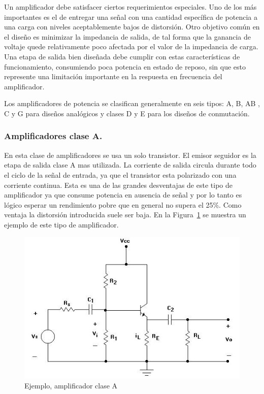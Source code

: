 Un amplificador debe satisfacer ciertos requerimientos especiales. Uno de los más importantes es el de entregar una señal con una cantidad específica de potencia a una carga con niveles aceptablemente bajos de distorsión. Otro objetivo común en el diseño es minimizar la impedancia de salida, de tal forma que la ganancia de voltaje quede relativamente poco afectada por el valor de la impedancia de carga. Una etapa de salida bien diseñada debe cumplir con estas características de funcionamiento, consumiendo poca potencia en estado de reposo, sin que esto represente una limitación importante en la respuesta en frecuencia del amplificador. 
 

Los amplificadores de potencia  se clasifican generalmente en seis tipos: A, B, AB , C y G para diseños analógicos y clases D y E para los diseños de conmutación. 
\medskip 
\subsubsection*{Amplificadores clase A.}


En esta clase de amplificadores se usa un solo transistor. El emisor seguidor es la etapa de salida clase A mas utilizada. La corriente de salida circula durante todo el ciclo de la señal de entrada, ya que el transistor esta polarizado con una corriente continua. Esta es una de las grandes desventajas de este tipo de amplificador ya que consume potencia en ausencia de señal y por lo tanto es lógico esperar un rendimiento pobre que en general no supera el 25\%. Como ventaja la distorsión introducida suele ser baja. En la Figura~\ref{ampliA} se muestra un ejemplo de este tipo de amplificador.
 
\begin{figure}[H]
\centering
\includegraphics[scale=0.6]{img/ampliA.png}
\caption{Ejemplo, amplificador clase A}
\label{ampliA} 
\end{figure}

